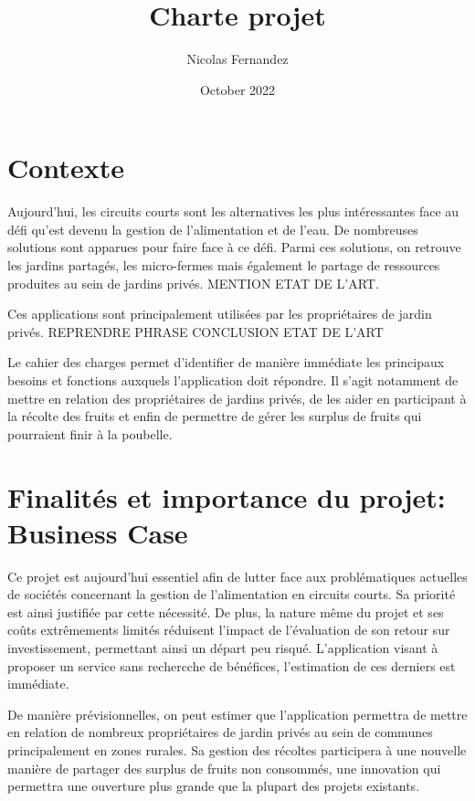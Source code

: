 \documentclass{article}
\title{Charte projet}
\author{Nicolas Fernandez}
\date{October 2022}
\begin{document}
\maketitle

\section{Contexte}

Aujourd'hui, les circuits courts sont les alternatives les plus intéressantes face au défi qu'est devenu la gestion de l'alimentation et de l'eau. De nombreuses solutions sont apparues pour faire face à ce défi. Parmi ces solutions, on retrouve les jardins partagés, les micro-fermes mais également le partage de ressources produites au sein de jardins privés. MENTION ETAT DE L'ART.

Ces applications sont principalement utilisées par les propriétaires de jardin privés. REPRENDRE PHRASE CONCLUSION ETAT DE L'ART

Le cahier des charges permet d'identifier de manière immédiate les principaux besoins et fonctions auxquels l'application doit répondre. Il s'agit notamment de mettre en relation des propriétaires de jardins privés, de les aider en participant à la récolte des fruits et enfin de permettre de gérer les surplus de fruits qui pourraient finir à la poubelle.

\maketitle

\section{Finalités et importance du projet: Business Case}

Ce projet est aujourd'hui essentiel afin de lutter face aux problématiques actuelles de sociétés concernant la gestion de l'alimentation en circuits courts. Sa priorité est ainsi justifiée par cette nécessité. De plus, la nature même du projet et ses coûts extrêmements limités réduisent l'impact de l'évaluation de son retour sur investissement, permettant ainsi un départ peu risqué. L'application visant à proposer un service sans rechercche de bénéfices, l'estimation de ces derniers est immédiate.

De manière prévisionnelles, on peut estimer que l'application permettra de mettre en relation de nombreux propriétaires de jardin privés au sein de communes principalement en zones rurales. Sa gestion des récoltes participera à une nouvelle manière de partager des surplus de fruits non consommés, une innovation qui permettra une ouverture plus grande que la plupart des projets existants.
\end{document}
